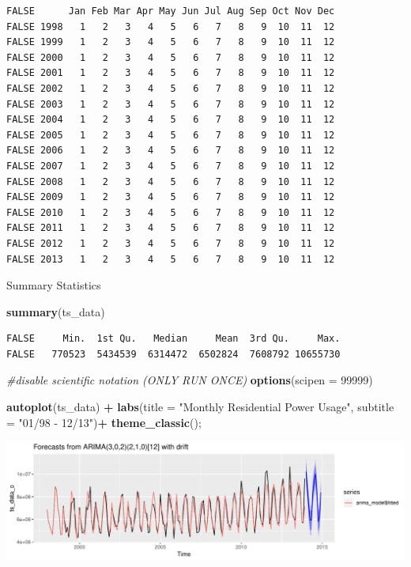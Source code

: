 \documentclass[openany]{book}
\newenvironment{Shaded}{\begin{snugshade}}{\end{snugshade}}
\newcommand{\KeywordTok}[1]{\textcolor[rgb]{0.13,0.29,0.53}{\textbf{#1}}}
\newcommand{\DataTypeTok}[1]{\textcolor[rgb]{0.13,0.29,0.53}{#1}}
\newcommand{\DecValTok}[1]{\textcolor[rgb]{0.00,0.00,0.81}{#1}}
\newcommand{\StringTok}[1]{\textcolor[rgb]{0.31,0.60,0.02}{#1}}
\newcommand{\CommentTok}[1]{\textcolor[rgb]{0.56,0.35,0.01}{\textit{#1}}}
\newcommand{\OperatorTok}[1]{\textcolor[rgb]{0.81,0.36,0.00}{\textbf{#1}}}
\newcommand{\NormalTok}[1]{#1}
\begin{document}
\begin{verbatim}
FALSE      Jan Feb Mar Apr May Jun Jul Aug Sep Oct Nov Dec
FALSE 1998   1   2   3   4   5   6   7   8   9  10  11  12
FALSE 1999   1   2   3   4   5   6   7   8   9  10  11  12
FALSE 2000   1   2   3   4   5   6   7   8   9  10  11  12
FALSE 2001   1   2   3   4   5   6   7   8   9  10  11  12
FALSE 2002   1   2   3   4   5   6   7   8   9  10  11  12
FALSE 2003   1   2   3   4   5   6   7   8   9  10  11  12
FALSE 2004   1   2   3   4   5   6   7   8   9  10  11  12
FALSE 2005   1   2   3   4   5   6   7   8   9  10  11  12
FALSE 2006   1   2   3   4   5   6   7   8   9  10  11  12
FALSE 2007   1   2   3   4   5   6   7   8   9  10  11  12
FALSE 2008   1   2   3   4   5   6   7   8   9  10  11  12
FALSE 2009   1   2   3   4   5   6   7   8   9  10  11  12
FALSE 2010   1   2   3   4   5   6   7   8   9  10  11  12
FALSE 2011   1   2   3   4   5   6   7   8   9  10  11  12
FALSE 2012   1   2   3   4   5   6   7   8   9  10  11  12
FALSE 2013   1   2   3   4   5   6   7   8   9  10  11  12
\end{verbatim}

Summary Statistics

\begin{Shaded}
\begin{Highlighting}[]
\KeywordTok{summary}\NormalTok{(ts_data)}
\end{Highlighting}
\end{Shaded}

\begin{verbatim}
FALSE     Min.  1st Qu.   Median     Mean  3rd Qu.     Max. 
FALSE   770523  5434539  6314472  6502824  7608792 10655730
\end{verbatim}

\begin{Shaded}
\begin{Highlighting}[]
\CommentTok{#disable scientific notation (ONLY RUN ONCE)}
\KeywordTok{options}\NormalTok{(}\DataTypeTok{scipen =} \DecValTok{99999}\NormalTok{)}

\KeywordTok{autoplot}\NormalTok{(ts_data) }\OperatorTok{+}
\KeywordTok{labs}\NormalTok{(}\DataTypeTok{title =} \StringTok{"Monthly Residential Power Usage"}\NormalTok{, }\DataTypeTok{subtitle =} \StringTok{"01/98 - 12/13"}\NormalTok{)}\OperatorTok{+}
\KeywordTok{theme_classic}\NormalTok{();}
\end{Highlighting}
\end{Shaded}

\includegraphics{Part-B-AS_files/figure-latex/unnamed-chunk-8-1.pdf}
\end{document}
